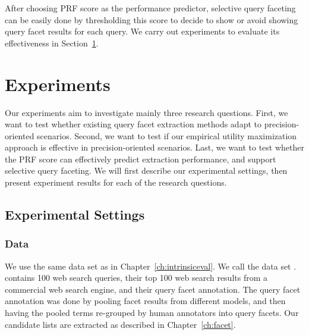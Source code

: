 After choosing PRF score as the performance predictor, selective query faceting can be easily done by thresholding this score to decide to show or avoid showing query facet results for each query. We carry out experiments to evaluate its effectiveness in Section~\ref{sec:precision-experiment}.


\section{Experiments}
\label{sec:precision-experiment}
Our experiments aim to investigate mainly three research questions. First, we want to test whether existing query facet extraction methods adapt to precision-oriented scenarios. Second, we want to test if our empirical utility maximization approach is effective in precision-oriented scenarios. Last, we want to test whether the PRF score can effectively predict extraction performance, and support selective query faceting. We will first describe our experimental settings, then present experiment results for each of the research questions.

\subsection{Experimental Settings}
\subsubsection{Data}
We use the same data set as in Chapter~\ref{ch:intrinsiceval}. We call the data set \DQF. \DQF contains 100 web search queries, their top 100 web search results from a commercial web search engine, and their query facet annotation. The query facet annotation was done by pooling facet results from different models, and then having the pooled terms re-grouped by human annotators into query facets. Our candidate lists are extracted as described in Chapter~\ref{ch:facet}.

